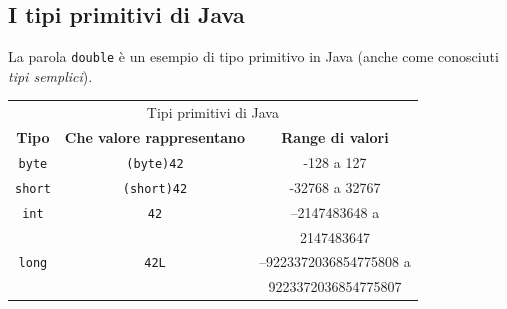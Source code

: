 \subsection*{I tipi primitivi di Java}
\begin{frame}
\begin{block}{}
La parola \texttt{double} è un esempio di tipo primitivo in Java (anche come conosciuti \textit{tipi semplici}).
\end{block}
\begin{tabular}{c c c}
\toprule
\multicolumn{3}{c}{Tipi primitivi di Java}\\
\cmidrule(r){1-3}
\textbf{Tipo} & \textbf{Che valore rappresentano} & \textbf{Range di valori}\\
\hline
\texttt{byte} & \texttt{(byte)42} & -128 a 127 \\
\hline
\texttt{short} & \texttt{(short)42} & -32768 a 32767 \\
\hline
\texttt{int} & \texttt{42} & –2147483648 a \\ 
 & & 2147483647\\
\hline
\texttt{long} & \texttt{42L} & –9223372036854775808 a\\
& & 9223372036854775807\\
\bottomrule
\end{tabular}
\end{frame}

